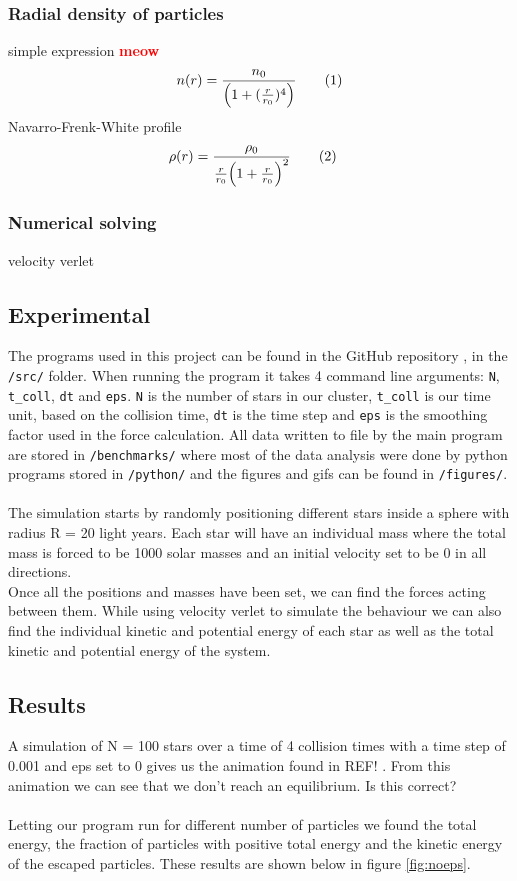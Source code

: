 \documentclass{article}
\newcommand\red[1]{\textcolor{red}{\textbf{#1}}}
\newcommand\numberthis{\addtocounter{equation}{1}\tag{\theequation}}
\newcommand{\husk}[1]{\color{red} #1 \color{black}}
\begin{document}
\subsubsection{Radial density of particles}
simple expression \red{meow}
\begin{align*}
  n(r) = \frac{n_0}{\Big(1+(\frac{r}{r_0})^4\Big)} \numberthis\label{eq:radial_dist}
\end{align*}
Navarro-Frenk-White profile
\begin{align*}
  \rho(r) &= \frac{\rho_0}{\frac{r}{r_0}\Big(1+\frac{r}{r_0}\Big)^2}\numberthis\label{eq:NFW}
\end{align*}
\subsubsection{Numerical solving}
velocity verlet
\subsection{Experimental}
The programs used in this project can be found in the GitHub repository \cite{GitHub}, in the \texttt{/src/} folder. When running the program it takes 4 command line arguments: \texttt{N}, \texttt{t\_coll}, \texttt{dt} and \texttt{eps}. \texttt{N} is the number of stars in our cluster, \texttt{t\_coll} is our time unit, based on the collision time, \texttt{dt} is the time step and \texttt{eps} is the smoothing factor used in the force calculation. All data written to file by the main program are stored in \texttt{/benchmarks/} where most of the data analysis were done by python programs stored in \texttt{/python/} and the figures and gifs can be found in \texttt{/figures/}. \\ \\
The simulation starts by randomly positioning different stars inside a sphere with radius R = 20 light years. Each star will have an individual mass where the total mass is forced to be 1000 solar masses and an initial velocity set to be 0 in all directions. \\
Once all the positions and masses have been set, we can find the forces acting between them. While using velocity verlet to simulate the behaviour we can also find the individual kinetic and potential energy of each star as well as the total kinetic and potential energy of the system. 
\subsection{Results}
A simulation of N = 100 stars over a time of 4 collision times with a time step of 0.001 and eps set to 0 gives us the animation found in \husk{REF!}. From this animation we can see that we don't reach an equilibrium. \husk{Is this correct?}
\\ \\
Letting our program run for different number of particles we found the total energy, the fraction of particles with positive total energy and the kinetic energy of the escaped particles. These results are shown below in figure \ref{fig:noeps}.
\end{document}
